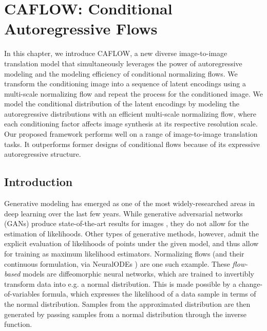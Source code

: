 
\chapter{CAFLOW: Conditional Autoregressive Flows} \label{Chapter:CAFLOW}  %

\ifpdf
    \graphicspath{{Chapter1/Figs/Raster/}{Chapter1/Figs/PDF/}{Chapter1/Figs/}}
\else
    \graphicspath{{Chapter1/Figs/Vector/}{Chapter1/Figs/}}
\fi

In this chapter, we introduce CAFLOW, a new diverse image-to-image translation model that simultaneously leverages the power of autoregressive modeling and the modeling efficiency of conditional normalizing flows. We transform the conditioning image into a sequence of latent encodings using a multi-scale normalizing flow and repeat the process for the conditioned image. We model the conditional distribution of the latent encodings by modeling the autoregressive distributions with an efficient multi-scale normalizing flow, where each conditioning factor affects image synthesis at its respective resolution scale. Our proposed framework performs well on a range of image-to-image translation tasks. It outperforms former designs of conditional flows because of its expressive autoregressive structure.

\section{Introduction}

Generative modeling has emerged as one of the most widely-researched areas in deep learning over the last few years. While generative adversarial networks (GANs) \cite{GANs} produce state-of-the-art results for images \cite{viazovetskyi2020stylegan2}, they do not allow for the estimation of likelihoods. Other types of generative methods, however, admit the explicit evaluation of likelihoods of points under the given model, and thus allow for training as maximum likelihood estimators. Normalizing flows \cite{rezende2015variational} (and their continuous formulation, via NeuralODEs \cite{neuralODEs}) are one such example. These \emph{flow-based} models are diffeomorphic neural networks, which are trained to invertibly transform data into e.g. a normal distribution. This is made possible by a change-of-variables formula, which expresses the likelihood of a data sample in terms of the normal distribution. Samples from the approximated distribution are then generated by passing samples from a normal distribution through the inverse function.

